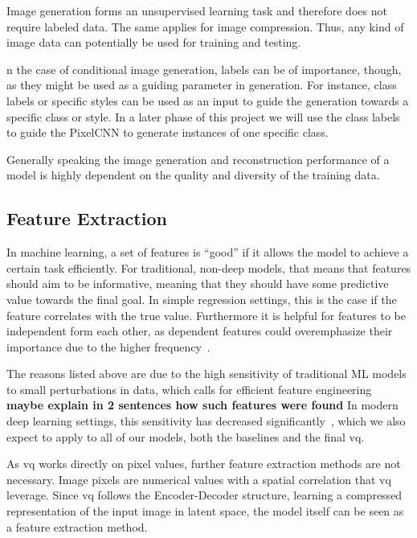 Image generation forms an unsupervised learning task and therefore does not require labeled data.
The same applies for image compression.
Thus, any kind of image data can potentially be used for training and testing.

n the case of conditional image generation, labels can be of importance, though, as they might be used as a guiding
parameter in generation.
For instance, class labels or specific styles  can be used as an input to guide the generation towards a specific class or style.
In a later phase of this project we will use the class labels to guide the PixelCNN to generate instances of one specific class.

Generally speaking the image generation and reconstruction performance of a model is highly dependent on the quality
and diversity of the training data.

\subsection{Feature Extraction}\label{subsec:feature-extraction}
In machine learning, a set of features is ``good'' if it allows the model to achieve a certain task
efficiently.
For traditional, non-deep models, that means that features should aim to be informative, meaning that
they should have some predictive value towards the final goal.
In simple regression settings, this is the case if the feature correlates with the true value.
Furthermore it is helpful for features to be independent form each other, as dependent features could overemphasize
their importance due to the higher frequency~\cite{featengineer}.

The reasons listed above are due to the high sensitivity of traditional ML models to small perturbations in data,
which calls for efficient feature engineering~\cite{lecun2015deep}
\textbf{maybe explain in 2 sentences how such features were found}
In modern deep learning settings, this sensitivity has decreased significantly~\cite{lecun2015deep}, which we also
expect to apply to all of our models, both the baselines and the final \ac{vq}.

As \ac{vq} works directly on pixel values, further feature extraction methods are not necessary.
Image pixels are numerical values with a spatial correlation that \ac{vq} leverage.
Since \ac{vq} follows the Encoder-Decoder structure, learning a compressed representation of the input image in latent
space, the model itself can be seen as a feature extraction method.

